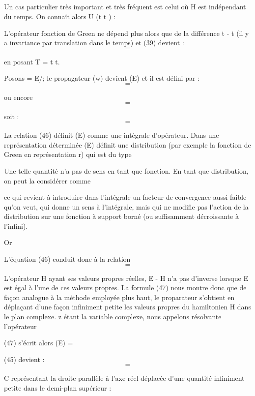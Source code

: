  

\subsection{}%

Un cas particulier très important et très fréquent est celui où
H est indépendant du temps.
On connaît alors U (t t ) :

L'opérateur fonction de Green ne dépend plus alors que de la différence
t - t (il y a invariance par translation dans le temps) et (39) devient :
\[
\tag{44}=
\]

en posant T = t t.

Posons  = E/; le propagateur (w) devient (E) et il est défini
par :
\[
\tag{45}=
\]


ou encore
\[
=
\]

soit :
\[
\tag{46}=
\]

La relation (46) définit (E) comme une intégrale d'opérateur. Dans
une représentation déterminée (E) définit une distribution (par
exemple la fonction de Green en représentation r) qui est du type

Une telle quantité n'a pas de sens en tant que fonction. En tant que distribution, on peut la considérer comme

ce qui revient à introduire dans l'intégrale un facteur de convergence aussi
faible qu'on veut, qui donne un sens à l'intégrale, mais qui ne modifie pas
l'action de la distribution sur une fonction à support borné (ou suffisamment
décroissante à l'infini).

Or

L'équation (46) conduit donc à la relation
\[
\tag{47}=
\]

L'opérateur H ayant ses valeurs propres réelles, E - H n'a pas d'inverse
lorsque E est égal à l'une de ces valeurs propres. La formule (47) nous
montre donc que de façon analogue à la méthode employée plus haut, le
proparateur s'obtient en déplaçant d'une façon infiniment petite les valeurs
propres du hamiltonien H dans le plan complexe. z étant la variable complexe,
nous appelons résolvante l'opérateur

(47) s'écrit alors (E) = 

(45) devient :
\[
\tag{48}=
\]

C représentant la droite parallèle à l'axe réel déplacée d'une quantité
infiniment petite dans le demi-plan supérieur :

